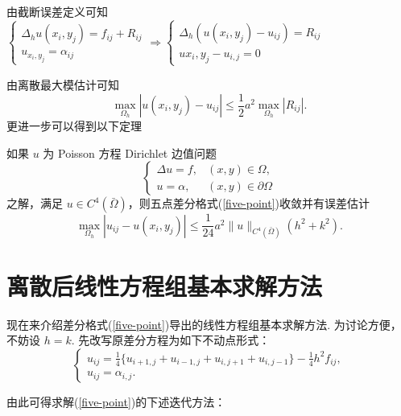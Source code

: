 由截断误差定义可知$\begin{cases}
\Delta_h u(x_i,y_j)= f_{ij} +R_{ij}\\
u_{x_i,y_j} = \alpha_{ij}
\end{cases}\Rightarrow \begin{cases}
    \Delta_h (u(x_i,y_j)-u_{ij})= R_{ij} \\
    u{x_i,y_j}-u_{i,j}=0
\end{cases}$\par
由离散最大模估计可知
\[\max_{\Omega_h} |u(x_i, y_j) - u_{ij}| \leq \frac{1}{2} a^2 \max_{\Omega_h} |R_{ij}|. \]
更进一步可以得到以下定理

\begin{theorem}[五点差分格式的收敛性与误差]
    如果 $u$ 为 Poisson 方程 Dirichlet 边值问题
    \[\begin{cases}
    \Delta u = f, & (x,y) \in \Omega, \\
    u = \alpha, & (x,y) \in \partial\Omega
    \end{cases}\]
    之解，满足 $u \in C^4(\bar{\Omega})$，则五点差分格式(\ref{five-point})收敛并有误差估计
    \[ \max_{\Omega_h} |u_{ij} - u(x_i, y_j)| \leq \frac{1}{24} a^2 \|u\|_{C^4(\bar{\Omega})} (h^2 + k^2). \]
\end{theorem}


\section{离散后线性方程组基本求解方法}

现在来介绍差分格式(\ref{five-point})导出的线性方程组基本求解方法. 为讨论方便，不妨设 $h = k$.
先改写原差分方程为如下不动点形式：
\[\begin{cases}
u_{ij} = \frac{1}{4} \{u_{i+1,j} + u_{i-1,j} + u_{i,j+1} + u_{i,j-1}\} - \frac{1}{4} h^2 f_{ij}, \\
u_{ij} = \alpha_{i,j}.
\end{cases}\]

由此可得求解(\ref{five-point})的下述迭代方法：

